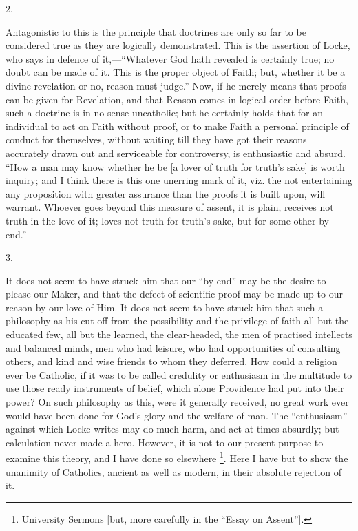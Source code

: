 2.

Antagonistic to this is the principle that doctrines are only so
far to be considered true as they are logically demonstrated. This is
the assertion of Locke, who says in defence of it,—``Whatever
God hath revealed is certainly true; no doubt can be made of it. This
is the proper object of Faith; but, whether it be a divine revelation
or no, reason must judge.'' Now, if he merely means that proofs
can be given for Revelation, and that Reason comes in logical order
before Faith, such a doctrine is in no sense uncatholic; but he
certainly holds that for an individual to act on Faith without proof,
or to make Faith a personal principle of conduct for themselves,
without waiting till they have got their reasons accurately drawn out
and serviceable for controversy, is enthusiastic and absurd. ``How
a man may know whether he be [a lover of truth for truth's sake] is
worth inquiry; and I think there is this one unerring mark of it, viz.
the not entertaining any proposition with greater assurance than the
proofs it is built upon, will warrant. Whoever goes beyond this
measure of assent, it is plain, receives not truth in the love of it;
loves not truth for truth's sake, but for some other by-end.''

3.

It does not seem to have struck him that our ``by-end'' may
be the desire to please our Maker, and that the defect of scientific
proof may be made up to our reason by our love of Him. It does not
seem to have struck him that such a philosophy as his cut off from the
possibility and the privilege of faith all but the educated few, all
but the learned, the clear-headed, the men of practised intellects and
balanced minds, men who had leisure, who had opportunities of
consulting others, and kind and wise friends to whom they deferred.
How could a religion ever be Catholic, if it was to be called
credulity or enthusiasm in the multitude to use those ready
instruments of belief, which alone Providence had put into their
power? On such philosophy as this, were it generally received, no
great work ever would have been done for God's glory and the welfare
of man. The ``enthusiasm'' against which Locke writes may do
much harm, and act at times absurdly; but calculation never made a
hero. However, it is not to our present purpose to examine this
theory, and I have done so elsewhere \footnote{University Sermons [but, more carefully in
the ``Essay on Assent''].}. Here I have but to show the unanimity of Catholics, ancient
as well as modern, in their absolute rejection of it.

